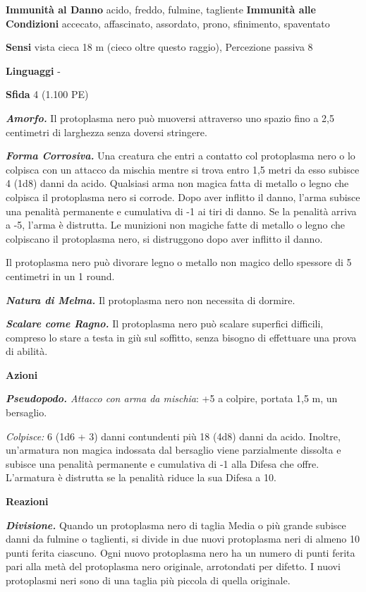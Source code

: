 \begin{multicols}{2}
\textbf{Immunità al Danno} acido, freddo, fulmine, tagliente
\textbf{Immunità alle Condizioni} accecato, affascinato, assordato,
prono, sfinimento, spaventato

\textbf{Sensi} vista cieca 18 m (cieco oltre questo raggio), Percezione
passiva 8

\textbf{Linguaggi} -

\textbf{Sfida} 4 (1.100 PE)

\emph{\textbf{Amorfo.}} Il protoplasma nero può muoversi attraverso uno
spazio fino a 2,5 centimetri di larghezza senza doversi stringere.

\emph{\textbf{Forma Corrosiva.}} Una creatura che entri a contatto col
protoplasma nero o lo colpisca con un attacco da mischia mentre si trova
entro 1,5 metri da esso subisce 4 (1d8) danni da acido. Qualsiasi arma
non magica fatta di metallo o legno che colpisca il protoplasma nero si
corrode. Dopo aver inflitto il danno, l'arma subisce una penalità
permanente e cumulativa di -1 ai tiri di danno. Se la penalità arriva a
-5, l'arma è distrutta. Le munizioni non magiche fatte di metallo o
legno che colpiscano il protoplasma nero, si distruggono dopo aver
inflitto il danno.

Il protoplasma nero può divorare legno o metallo non magico dello
spessore di 5 centimetri in un 1 round.

\emph{\textbf{Natura di Melma.}} Il protoplasma nero non necessita di
dormire.

\emph{\textbf{Scalare come Ragno.}} Il protoplasma nero può scalare
superfici difficili, compreso lo stare a testa in giù sul soffitto,
senza bisogno di effettuare una prova di abilità.

\textbf{Azioni}

\emph{\textbf{Pseudopodo.} Attacco con arma da mischia}: +5 a colpire,
portata 1,5 m, un bersaglio.

\emph{Colpisce:} 6 (1d6 + 3) danni contundenti più 18 (4d8) danni da
acido. Inoltre, un'armatura non magica indossata dal bersaglio viene
parzialmente dissolta e subisce una penalità permanente e cumulativa di
-1 alla Difesa che offre. L'armatura è distrutta se la penalità riduce la
sua Difesa a 10.

\textbf{Reazioni}

\emph{\textbf{Divisione.}} Quando un protoplasma nero di taglia Media o
più grande subisce danni da fulmine o taglienti, si divide in due nuovi
protoplasma neri di almeno 10 punti ferita ciascuno. Ogni nuovo
protoplasma nero ha un numero di punti ferita pari alla metà del
protoplasma nero originale, arrotondati per difetto. I nuovi protoplasmi
neri sono di una taglia più piccola di quella originale.


\end{multicols}
